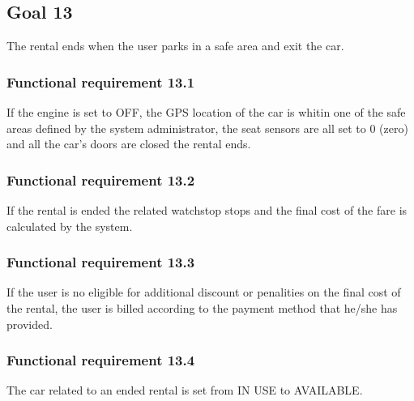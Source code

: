 \subsection{Goal 13}
The rental ends when the user parks in a safe area and exit the car.

\setcounter{secnumdepth}{3}
\subsubsection{Functional requirement 13.1}
If the engine is set to OFF, the GPS location of the car is whitin one of the safe areas defined by the system administrator, the seat sensors are all set to 0 (zero) and all the car's doors are closed the rental ends.

\subsubsection{Functional requirement 13.2}
If the rental is ended the related watchstop stops and the final cost of the fare is calculated by the system.

\subsubsection{Functional requirement 13.3}
If the user is no eligible for additional discount or penalities on the final cost of the rental, the user is billed according to the payment method that he/she has provided.

\subsubsection{Functional requirement 13.4}
The car related to an ended rental is set from IN USE to AVAILABLE.
